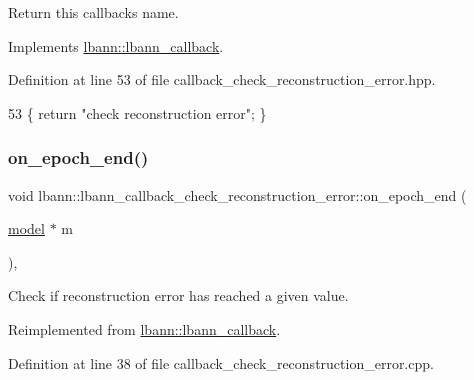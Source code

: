 Return this callback\textquotesingle{}s name. 

Implements \hyperlink{classlbann_1_1lbann__callback_a7522c7a14f1d6a1ea762cc2d7248eb3a}{lbann\+::lbann\+\_\+callback}.



Definition at line 53 of file callback\+\_\+check\+\_\+reconstruction\+\_\+error.\+hpp.


\begin{DoxyCode}
53 \{ \textcolor{keywordflow}{return} \textcolor{stringliteral}{"check reconstruction error"}; \}
\end{DoxyCode}
\mbox{\label{classlbann_1_1lbann__callback__check__reconstruction__error_a8a6a72b8016d3ba3ad11b5e7e2f3f5df}} 
\subsubsection{\texorpdfstring{on\+\_\+epoch\+\_\+end()}{on\_epoch\_end()}}
{\footnotesize\ttfamily void lbann\+::lbann\+\_\+callback\+\_\+check\+\_\+reconstruction\+\_\+error\+::on\+\_\+epoch\+\_\+end (\begin{DoxyParamCaption}\item[{\hyperlink{classlbann_1_1model}{model} $\ast$}]{m }\end{DoxyParamCaption})\hspace{0.3cm}{\ttfamily [override]}, {\ttfamily [virtual]}}

Check if reconstruction error has reached a given value. 

Reimplemented from \hyperlink{classlbann_1_1lbann__callback_a1fc71110e7f754bf73c9e0f344a448a5}{lbann\+::lbann\+\_\+callback}.



Definition at line 38 of file callback\+\_\+check\+\_\+reconstruction\+\_\+error.\+cpp.


